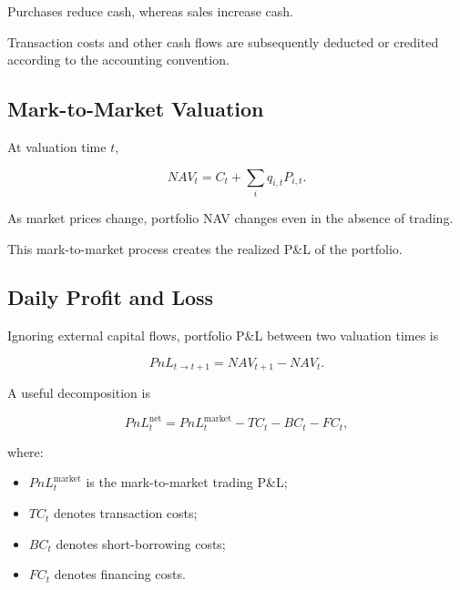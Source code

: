\documentclass[11pt,a4paper]{article}
\begin{document}
Purchases reduce cash, whereas sales increase cash.

Transaction costs and other cash flows are subsequently deducted or credited
according to the accounting convention.


\subsection{Mark-to-Market Valuation}

At valuation time $t$,

\begin{equation}
\boxed{
NAV_t
=
C_t
+
\sum_i
q_{i,t}
P_{i,t}.
}
\end{equation}

As market prices change, portfolio NAV changes even in the absence of trading.

This mark-to-market process creates the realized P\&L of the portfolio.


\subsection{Daily Profit and Loss}

Ignoring external capital flows, portfolio P\&L between two valuation times is

\begin{equation}
\boxed{
PnL_{t\rightarrow t+1}
=
NAV_{t+1}
-
NAV_t.
}
\end{equation}

A useful decomposition is

\begin{equation}
\boxed{
PnL_t^{\mathrm{net}}
=
PnL_t^{\mathrm{market}}
-
TC_t
-
BC_t
-
FC_t,
}
\end{equation}

where:

\begin{itemize}
    \item $PnL_t^{\mathrm{market}}$ is the mark-to-market trading P\&L;
    \item $TC_t$ denotes transaction costs;
    \item $BC_t$ denotes short-borrowing costs;
    \item $FC_t$ denotes financing costs.
\end{itemize}
\end{document}
